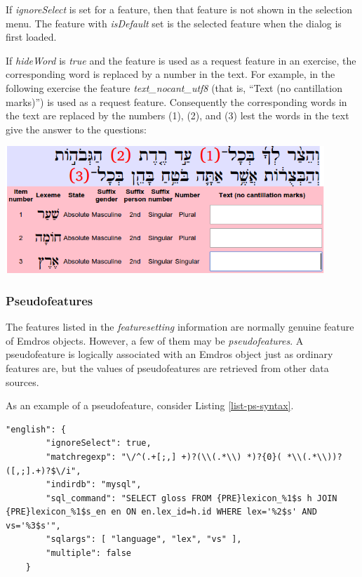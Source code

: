 \documentclass[11pt,oneside,a4paper]{memoir}
\begin{document}
If \emph{ignoreSelect} is set for a feature, then that feature is not shown in the selection menu.
The feature with \emph{isDefault} set is the selected feature when the dialog is first loaded.

If \emph{hideWord} is \emph{true} and the feature is used as a request feature%
in an exercise, the corresponding word is replaced by a number in the text. For example,
in the following exercise the feature \emph{text\_nocant\_utf8} (that is, ``Text (no cantillation
marks)'') is used as a request feature. Consequently the corresponding words in the text are
replaced by the numbers (1), (2), and (3) lest the words in the text give the answer to the
questions:


\begin{center}
  \includegraphics[width=0.9\textwidth]{numbers.png}
\end{center}

\subsubsection{Pseudofeatures}\label{sec-pseudofeature}

The features listed in the \emph{featuresetting} information are normally genuine feature of Emdros
objects. However, a few of them may be \emph{pseudofeatures}. A pseudofeature is logically
associated with an Emdros object just as ordinary features are, but the values of pseudofeatures are
retrieved from other data sources.

As an example of a pseudofeature, consider Listing \ref{list-ps-syntax}.

\begin{lstlisting}[escapechar=\#,caption=Featuresetting syntax for a pseudofeature,label=list-ps-syntax]
    "english": {
        "ignoreSelect": true,
        "matchregexp": "\/^(.+[;,] +)?(\\(.*\\) *)?{0}( *\\(.*\\))?([,;].+)?$\/i",
        "indirdb": "mysql",
        "sql_command": "SELECT gloss FROM {PRE}lexicon_%1$s h JOIN {PRE}lexicon_%1$s_en en ON en.lex_id=h.id WHERE lex='%2$s' AND vs='%3$s'",
        "sqlargs": [ "language", "lex", "vs" ],
        "multiple": false
    }
\end{lstlisting}
\end{document}
